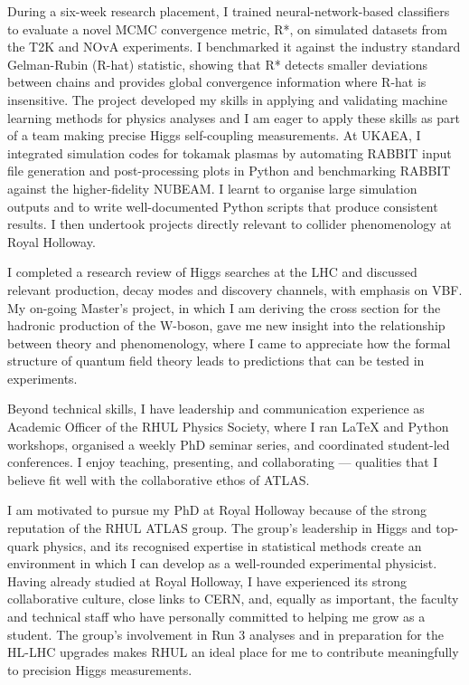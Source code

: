 \documentclass[11pt]{report}
\begin{document}
\begin{titlepage}
During a six-week research placement, I trained neural-network-based classifiers to evaluate a novel MCMC convergence metric, R*, on simulated datasets from the T2K and NOvA experiments. I benchmarked it against the industry standard Gelman-Rubin (R-hat) statistic, showing that R* detects smaller deviations between chains and provides global convergence information where R-hat is insensitive. The project developed my skills in applying and validating machine learning methods for physics analyses and I am eager to apply these skills as part of a team making precise Higgs self-coupling measurements. At UKAEA, I integrated simulation codes for tokamak plasmas by automating RABBIT input file generation and post-processing plots in Python and benchmarking RABBIT against the higher-fidelity NUBEAM. I learnt to organise large simulation outputs and to write well-documented Python scripts that produce consistent results. I then undertook projects directly relevant to collider phenomenology at Royal Holloway.\\
\vspace{0.9em}


I completed a research review of Higgs searches at the LHC and discussed relevant production, decay modes and discovery channels, with emphasis on VBF. My on-going Master’s project, in which I am deriving the cross section for the hadronic production of the W-boson, gave me new insight into the relationship between theory and phenomenology, where I came to appreciate how the formal structure of quantum field theory leads to predictions that can be tested in experiments.\\
\vspace{0.9em}


Beyond technical skills, I have leadership and communication experience as Academic Officer of the RHUL Physics Society, where I ran LaTeX and Python workshops, organised a weekly PhD seminar series, and coordinated student-led conferences. I enjoy teaching, presenting, and collaborating --- qualities that I believe fit well with the collaborative ethos of ATLAS.\\
\vspace{0.9em}


I am motivated to pursue my PhD at Royal Holloway because of the strong reputation of the RHUL ATLAS group. The group’s leadership in Higgs and top-quark physics, and its recognised expertise in statistical methods create an environment in which I can develop as a well-rounded experimental physicist. Having already studied at Royal Holloway, I have experienced its strong collaborative culture, close links to CERN, and, equally as important, the faculty and technical staff who have personally committed to helping me grow as a student. The group’s involvement in Run 3 analyses and in preparation for the HL-LHC upgrades makes RHUL an ideal place for me to contribute meaningfully to precision Higgs measurements.\\
\vspace{0.9em}



\end{titlepage}
\end{document}
